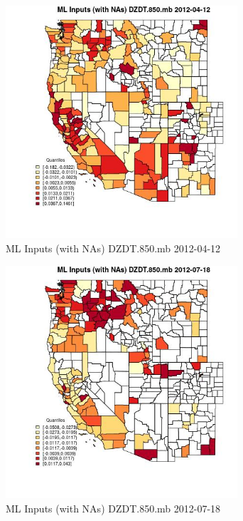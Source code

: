 \begin{figure} 
\centering  
\includegraphics[width=0.77\textwidth]{Code_Outputs/Report_ML_input_PM25_Step4_part_e_de_duplicated_aves_compiled_2019-05-14wNAs_CountyDZDT850mbMean2012-04-12_2012-04-12.jpg} 
\caption{\label{fig:Report_ML_input_PM25_Step4_part_e_de_duplicated_aves_compiled_2019-05-14wNAsCountyDZDT850mbMean2012-04-12_2012-04-12}ML Inputs (with NAs) DZDT.850.mb 2012-04-12} 
\end{figure} 
 

\begin{figure} 
\centering  
\includegraphics[width=0.77\textwidth]{Code_Outputs/Report_ML_input_PM25_Step4_part_e_de_duplicated_aves_compiled_2019-05-14wNAs_CountyDZDT850mbMean2012-07-18_2012-07-18.jpg} 
\caption{\label{fig:Report_ML_input_PM25_Step4_part_e_de_duplicated_aves_compiled_2019-05-14wNAsCountyDZDT850mbMean2012-07-18_2012-07-18}ML Inputs (with NAs) DZDT.850.mb 2012-07-18} 
\end{figure} 
 

